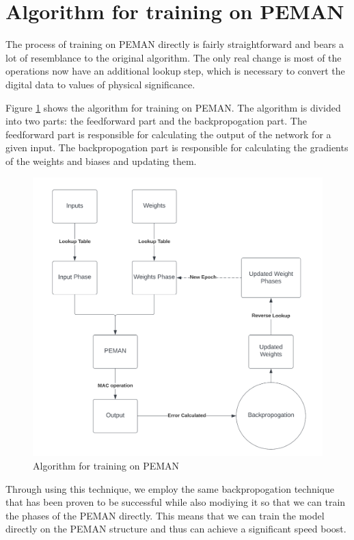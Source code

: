 \section{Algorithm for training on PEMAN}

The process of training on PEMAN directly is fairly straightforward and bears a lot of resemblance to the original algorithm. The only real change is most of the operations now have an additional lookup step, which is necessary to convert the digital data to values of physical significance.

Figure \ref{trainOnPemanAlgo} shows the algorithm for training on PEMAN. The algorithm is divided into two parts: the feedforward part and the backpropogation part. The feedforward part is responsible for calculating the output of the network for a given input. The backpropogation part is responsible for calculating the gradients of the weights and biases and updating them.

\begin{figure}
	\centering
	\includegraphics[width=\textwidth]{images/trainOnPemanAlgo.png}
	\caption{Algorithm for training on PEMAN}
	\label{trainOnPemanAlgo}
\end{figure}

Through using this technique, we employ the same backpropogation technique that has been proven to be successful while also modiying it so that we can train the phases of the PEMAN directly. This means that we can train the model directly on the PEMAN structure and thus can achieve a significant speed boost.

